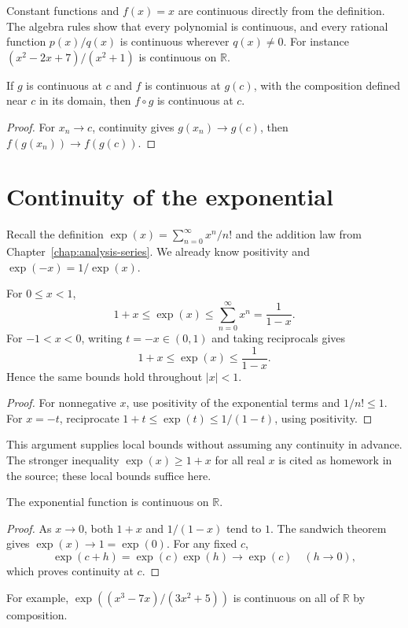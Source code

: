 \begin{example}
Constant functions and $f(x)=x$ are continuous directly from the definition.
The algebra rules show that every polynomial is continuous, and every
rational function $p(x)/q(x)$ is continuous wherever $q(x)\ne0$.
For instance $(x^2-2x+7)/(x^2+1)$ is continuous on $\mathbb R$.
\end{example}

\begin{theorem}[Composition]
If $g$ is continuous at $c$ and $f$ is continuous at $g(c)$, with the
composition defined near $c$ in its domain, then $f\circ g$ is continuous
at $c$.
\end{theorem}
\begin{proof}
For $x_n\to c$, continuity gives $g(x_n)\to g(c)$, then
$f(g(x_n))\to f(g(c))$.
\end{proof}

\section{Continuity of the exponential}
Recall the definition $\exp(x)=\sum_{n=0}^{\infty}x^n/n!$ and the addition
law from Chapter~\ref{chap:analysis-series}. We already know positivity
and $\exp(-x)=1/\exp(x)$.

\begin{lemma}\label{lem:analysis-exp-bounds}
For $0\leq x<1$,
\[
1+x\leq\exp(x)\leq\sum_{n=0}^{\infty}x^n=\frac1{1-x}.
\]
For $-1<x<0$, writing $t=-x\in(0,1)$ and taking reciprocals gives
\[
1+x\leq\exp(x)\leq\frac1{1-x}.
\]
Hence the same bounds hold throughout $|x|<1$.
\end{lemma}
\begin{proof}
For nonnegative $x$, use positivity of the exponential terms and
$1/n!\leq1$. For $x=-t$, reciprocate
$1+t\leq\exp(t)\leq1/(1-t)$, using positivity.
\end{proof}
This argument supplies local bounds without assuming any continuity in
advance. The stronger inequality $\exp(x)\geq1+x$ for all real $x$ is
cited as homework in the source; these local bounds suffice here.

\begin{theorem}
The exponential function is continuous on $\mathbb R$.
\end{theorem}
\begin{proof}
As $x\to0$, both $1+x$ and $1/(1-x)$ tend to $1$. The sandwich theorem
gives $\exp(x)\to1=\exp(0)$.
For any fixed $c$,
\[
\exp(c+h)=\exp(c)\exp(h)\longrightarrow\exp(c)
\quad(h\to0),
\]
which proves continuity at $c$.
\end{proof}
For example, $\exp((x^3-7x)/(3x^2+5))$ is continuous on all of $\mathbb R$
by composition.

